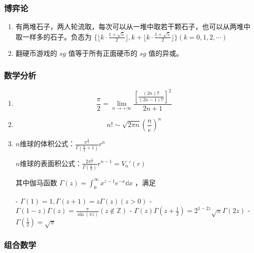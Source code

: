 \subsubsection{博弈论}

\begin{enumerate}

\item 有两堆石子，两人轮流取，每次可以从一堆中取若干颗石子，也可以从两堆中取一样多的石子。负态为 $\{\lfloor k\cdot\frac{1+\sqrt{5}}{2}\rfloor, k+\lfloor k\cdot\frac{1+\sqrt{5}}{2}\rfloor\}(k = 0,1,2,\cdots)$

\item 翻硬币游戏的 $sg$ 值等于所有正面硬币的 $sg$ 值的异或。

\end{enumerate}

\subsubsection{数学分析}

\begin{enumerate}

\item

$$
\frac{\pi}{2} = \lim_{n \to +\infty}\frac{[\frac{(2n)!!}{(2n-1)!!}]^{2}}{2n+1}
$$

\item

$$
n!\sim\sqrt{2\pi n}(\frac{n}{e})^{n}
$$

\item $n$维球的体积公式：$\displaystyle{\frac{\pi^{\frac{n}{2}}}{\Gamma(\frac{n}{2}+1)}r^{n}}$

$n$维球的表面积公式：$\displaystyle{\frac{2\pi^{\frac{n}{2}}}{\Gamma(\frac{n}{2})}r^{n-1}=V_{n}'(r)}$

其中伽马函数 $\Gamma(z)=\int_{0}^{\infty}x^{z-1}e^{-x}\mathbb{d}x$ ，满足

 - $\Gamma(1)=1,\Gamma(z+1)=z\Gamma(z)(z>0)$
 - $\Gamma(1-z)\Gamma(z)=\frac{\pi}{\sin(\pi z)}(z\notin\mathbb{Z})$
 - $\Gamma(z)\Gamma(z+\frac{1}{2})=2^{1-2z}\sqrt{\pi}\Gamma(2z)$
 - $\Gamma(\frac{1}{2})=\sqrt{\pi}$

\end{enumerate}

\subsubsection{组合数学}

